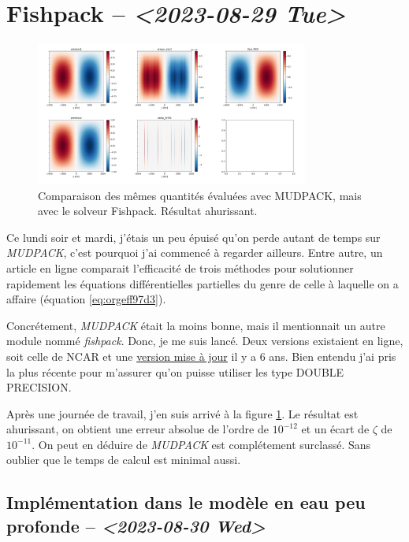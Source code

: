 \documentclass[10pt]{report}
\numberwithin{equation}{section}
\begin{document}
\section{Fishpack -- \textit{<2023-08-29 Tue>}}
\label{sec:org1936800}

\begin{figure}[!htpb]
\centering
\includegraphics[width=0.8\textwidth]{figures/fishpack/2023-08-29-fishtest.png}
\caption{\label{fig:orgb5830c7}Comparaison des mêmes quantités évaluées avec MUDPACK, mais avec le solveur Fishpack. Résultat ahurissant.}
\end{figure}

Ce lundi soir et mardi, j'étais un peu épuisé qu'on perde autant de temps sur \emph{MUDPACK}, c'est pourquoi j'ai commencé à regarder ailleurs.
Entre autre, un article en ligne comparait l'efficacité de trois méthodes pour solutionner rapidement les équations différentielles partielles du genre de celle à laquelle on a affaire (équation \ref{eq:orgeff97d3}).\bigskip

Concrétement, \emph{MUDPACK} était la moins bonne, mais il mentionnait un autre module nommé \emph{fishpack}.
Donc, je me suis lancé.
Deux versions existaient en ligne, soit celle de NCAR et une \href{https://github.com/jlokimlin/fishpack}{version mise à jour} il y a 6 ans.
Bien entendu j'ai pris la plus récente pour m'assurer qu'on puisse utiliser les type DOUBLE PRECISION.\bigskip

Après une journée de travail, j'en suis arrivé à la figure \ref{fig:orgb5830c7}.
Le résultat est ahurissant, on obtient une erreur absolue de l'ordre de \(10^{-12}\) et un écart de \(\zeta\) de \(10^{-11}\).
On peut en déduire de \emph{MUDPACK} est complétement surclassé.
Sans oublier que le temps de calcul est minimal aussi.

\subsection{Implémentation dans le modèle en eau peu profonde -- \textit{<2023-08-30 Wed>}}
\label{sec:org2fa8f9b}
\end{document}
